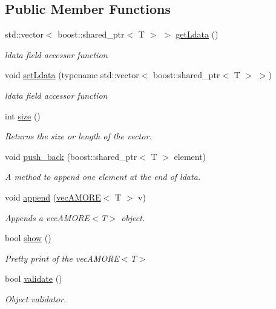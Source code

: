 \subsection*{Public Member Functions}
\begin{DoxyCompactItemize}
\item 
std::vector$<$ boost::shared\_\-ptr$<$ T $>$ $>$ \hyperlink{classvec_a_m_o_r_e_aeabf8a479f9031cc8ef9af0a971a08ea}{getLdata} ()
\begin{DoxyCompactList}\small\item\em ldata field accessor function \end{DoxyCompactList}\item 
void \hyperlink{classvec_a_m_o_r_e_ad1594c084d534c3de7acedd714f2e12a}{setLdata} (typename std::vector$<$ boost::shared\_\-ptr$<$ T $>$ $>$)
\begin{DoxyCompactList}\small\item\em ldata field accessor function \end{DoxyCompactList}\item 
int \hyperlink{classvec_a_m_o_r_e_ae1289a7870dbdd19b6455a890e94ce48}{size} ()
\begin{DoxyCompactList}\small\item\em Returns the size or length of the vector. \end{DoxyCompactList}\item 
void \hyperlink{classvec_a_m_o_r_e_a7b02ec757039b4d8fa98c3682002f156}{push\_\-back} (boost::shared\_\-ptr$<$ T $>$ element)
\begin{DoxyCompactList}\small\item\em A method to append one element at the end of ldata. \end{DoxyCompactList}\item 
void \hyperlink{classvec_a_m_o_r_e_ab060ffa67e85997fc4236bedfd2f17b6}{append} (\hyperlink{classvec_a_m_o_r_e}{vecAMORE}$<$ T $>$ v)
\begin{DoxyCompactList}\small\item\em Appends a vecAMORE$<$T$>$ object. \end{DoxyCompactList}\item 
bool \hyperlink{classvec_a_m_o_r_e_a11b0ffb0d2481f1960cb49a26b227d37}{show} ()
\begin{DoxyCompactList}\small\item\em Pretty print of the vecAMORE$<$T$>$ \end{DoxyCompactList}\item 
bool \hyperlink{classvec_a_m_o_r_e_a247aaafe9115cc433fc3be297c1f568e}{validate} ()
\begin{DoxyCompactList}\small\item\em Object validator. \end{DoxyCompactList}\end{DoxyCompactItemize}
